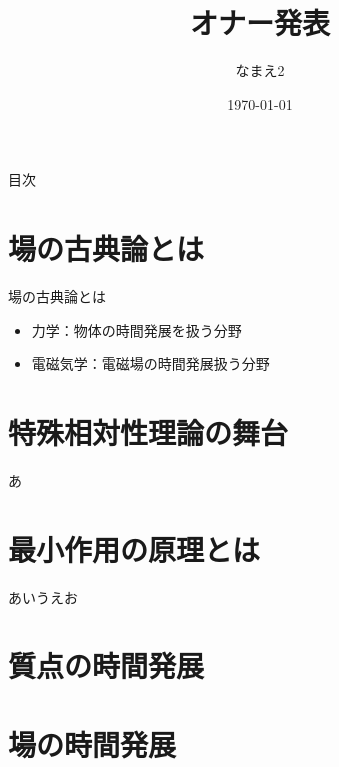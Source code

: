 \documentclass[unicode, lualatex, aspectratio=169, 10.5pt]{beamer}
\title[オナー発表]{オナー発表} %
\author[なまえ1]{なまえ2}     %
\institute[A]{B}              %
\date{\today}                 %
\begin{document}
\begin{frame}
  \titlepage
\end{frame}

\begin{frame}{目次}
  \tableofcontents
\end{frame}

\section{場の古典論とは}

\begin{frame}{場の古典論とは}
  \begin{itemize}
    \item 力学：物体の時間発展を扱う分野
    \item 電磁気学：電磁場の時間発展扱う分野
  \end{itemize}
\end{frame}



\section{特殊相対性理論の舞台}

\begin{frame}
  あ
\end{frame}

\section{最小作用の原理とは}

\begin{frame}
  あいうえお
\end{frame}


\section{質点の時間発展}



\section{場の時間発展}
\end{document}
